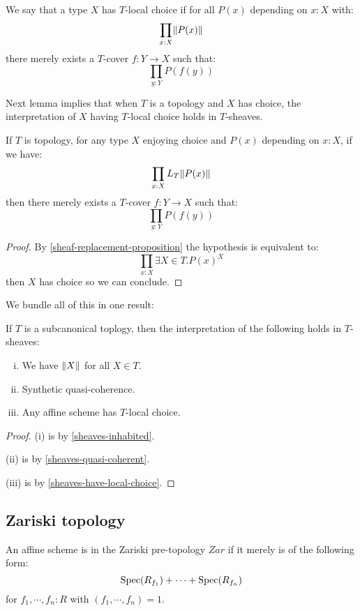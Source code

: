 \begin{definition}
We say that a type $X$ has $T$-local choice if for all $P(x)$ depending on $x:X$ with:
\[\prod_{x:X}\lVert P(x) \rVert \]
there merely exists a $T$-cover $f:Y\to X$ such that:
\[ \prod_{y:Y}P(f(y))\]
\end{definition}

Next lemma implies that when $T$ is a topology and $X$ has choice, the interpretation of $X$ having $T$-local choice holds in $T$-sheaves.

\begin{lemma}\label{sheaves-have-local-choice}
If $T$ is topology, for any type $X$ enjoying choice and $P(x)$ depending on $x:X$, if we have:
\[\prod_{x:X}L_T\lVert P(x) \rVert\]
then there merely exists a $T$-cover $f:Y\to X$ such that:
\[ \prod_{y:Y}P(f(y))\]
\end{lemma}

\begin{proof}
By \cref{sheaf-replacement-proposition} the hypothesis is equivalent to:
\[\prod_{x:X}\exists X\in T. P(x)^X\]
then $X$ has choice so we can conclude.
\end{proof}

We bundle all of this in one result:

\begin{theorem}\label{main-result-sheaves}
If $T$ is a subcanonical toplogy, then the interpretation of the following holds in $T$-sheaves:
\begin{enumerate}[(i)]
\item We have $\lVert X \rVert$ for all $X\in T$.
\item Synthetic quasi-coherence.
\item Any affine scheme has $T$-local choice.
\end{enumerate}
\end{theorem}

\begin{proof}
(i) is by \cref{sheaves-inhabited}.

(ii) is by \cref{sheaves-quasi-coherent}.

(iii) is by \cref{sheaves-have-local-choice}.
\end{proof}

\subsection{Zariski topology}

\begin{definition}
An affine scheme is in the Zariski pre-topology $Zar$ if it merely is of the following form:
\[\operatorname{Spec}(R_{f_1})+ \cdots +\operatorname{Spec}(R_{f_n})\]
for $f_1,\cdots, f_n:R$ with $(f_1,\cdots,f_n)=1$.
\end{definition}

